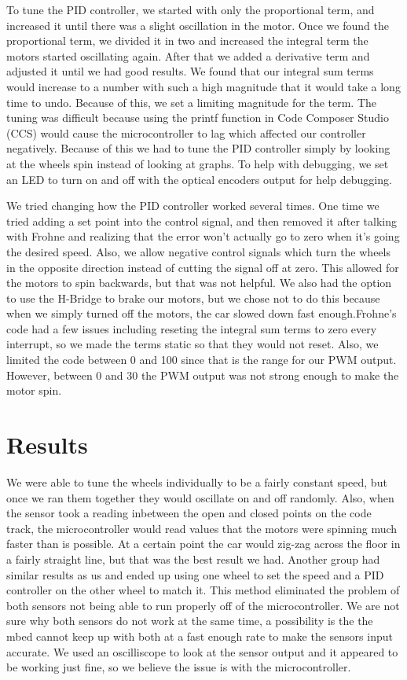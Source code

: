 \documentclass{article}
\begin{document}
To tune the PID controller, we started with only the proportional term, and increased it until there was a slight oscillation in the motor. Once we found the proportional term, we divided it in two and increased the integral term the motors started oscillating again. After that we added a derivative term and adjusted it until we had good results. We found that our integral sum terms would increase to a number with such a high magnitude that it would take a long time to undo. Because of this, we set a limiting magnitude for the term. The tuning was difficult because using the printf function in Code Composer Studio (CCS) would cause the microcontroller to lag which affected our controller negatively. Because of this we had to tune the PID controller simply by looking at the wheels spin instead of looking at graphs. To help with debugging, we set an LED to turn on and off with the optical encoders output for help debugging. 

We tried changing how the PID controller worked several times. One time we tried adding a set point into the control signal, and then removed it after talking with Frohne and realizing that the error won't actually go to zero when it's going the desired speed. Also, we allow negative control signals which turn the wheels in the opposite direction instead of cutting the signal off at zero. This allowed for the motors to spin backwards, but that was not helpful. We also had the option to use the H-Bridge to brake our motors, but we chose not to do this because when we simply turned off the motors, the car slowed down fast enough.Frohne's code had a few issues including reseting the integral sum terms to zero every interrupt, so we made the terms static so that they would not reset. Also, we limited the code between 0 and 100 since that is the range for our PWM output. However, between 0 and 30 the PWM output was not strong enough to make the motor spin. 

\section{Results}
We were able to tune the wheels individually to be a fairly constant speed, but once we ran them together they would oscillate on and off randomly. Also, when the sensor took a reading inbetween the open and closed points on the code track, the microcontroller would read values that the motors were spinning much faster than is possible. At a certain point the car would zig-zag across the floor in a fairly straight line, but that was the best result we had. Another group had similar results as us and ended up using one wheel to set the speed and a PID controller on the other wheel to match it. This method eliminated the problem of both sensors not being able to run properly off of the microcontroller. We are not sure why both sensors do not work at the same time, a possibility is the the mbed cannot keep up with both at a fast enough rate to make the sensors input accurate. We used an oscilliscope to look at the sensor output and it appeared to be working just fine, so we believe the issue is with the microcontroller.
\end{document}
